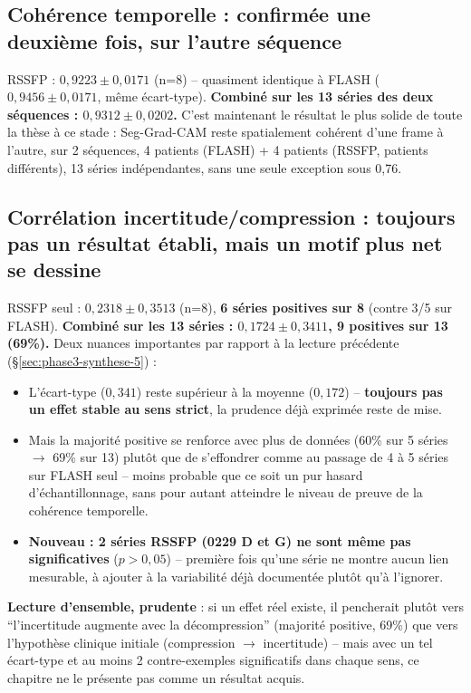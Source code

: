 \documentclass[11pt,a4paper]{report}
\begin{document}
\subsection{Cohérence temporelle : confirmée une deuxième fois, sur l'autre
séquence}

RSSFP : $0{,}9223 \pm 0{,}0171$ (n=8) -- quasiment identique à FLASH
($0{,}9456\pm0{,}0171$, même écart-type). \textbf{Combiné sur les 13 séries des deux
séquences : $0{,}9312 \pm 0{,}0202$.} C'est maintenant le résultat le plus solide
de toute la thèse à ce stade : Seg-Grad-CAM reste spatialement cohérent d'une frame
à l'autre, sur 2 séquences, 4 patients (FLASH) + 4 patients (RSSFP, patients
différents), 13 séries indépendantes, sans une seule exception sous 0,76.

\subsection{Corrélation incertitude/compression : toujours pas un résultat établi,
mais un motif plus net se dessine}

RSSFP seul : $0{,}2318\pm0{,}3513$ (n=8), \textbf{6 séries positives sur 8}
(contre 3/5 sur FLASH). \textbf{Combiné sur les 13 séries : $0{,}1724\pm0{,}3411$,
9 positives sur 13 (69\%).} Deux nuances importantes par rapport à la lecture
précédente (\S\ref{sec:phase3-synthese-5}) :

\begin{itemize}[nosep]
    \item L'écart-type ($0{,}341$) reste supérieur à la moyenne ($0{,}172$) --
        \textbf{toujours pas un effet stable au sens strict}, la prudence déjà
        exprimée reste de mise.
    \item Mais la majorité positive se renforce avec plus de données (60\% sur 5
        séries $\to$ 69\% sur 13) plutôt que de s'effondrer comme au passage de 4 à
        5 séries sur FLASH seul -- moins probable que ce soit un pur hasard
        d'échantillonnage, sans pour autant atteindre le niveau de preuve de la
        cohérence temporelle.
    \item \textbf{Nouveau : 2 séries RSSFP (0229 D et G) ne sont même pas
        significatives} ($p>0{,}05$) -- première fois qu'une série ne montre aucun
        lien mesurable, à ajouter à la variabilité déjà documentée plutôt qu'à
        l'ignorer.
\end{itemize}

\textbf{Lecture d'ensemble, prudente} : si un effet réel existe, il pencherait
plutôt vers ``l'incertitude augmente avec la décompression'' (majorité positive,
69\%) que vers l'hypothèse clinique initiale (compression $\to$ incertitude) --
mais avec un tel écart-type et au moins 2 contre-exemples significatifs dans chaque
sens, ce chapitre ne le présente pas comme un résultat acquis.
\end{document}
